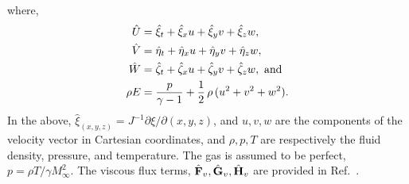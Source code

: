 \documentclass[aps,pra,preprint,groupedaddress]{revtex4-1}
\newcommand{\abs}[1]{\left| #1 \right|} %
\newcommand{\pd}[2]{\dfrac{\partial #1}{\partial #2}}
\renewcommand{\=}[1]{\stackrel{#1}{=}} %
\begin{document}
%
where, 
\begin{align}
  \hat{U} &= \hat{\xi}_t   + \hat{\xi}_x u   + \hat{\xi}_y v   + \hat{\xi}_z w,             \nonumber \\
  \hat{V} &= \hat{\eta}_t  + \hat{\eta}_x u  + \hat{\eta}_y v  + \hat{\eta}_z w,            \nonumber \\
  \hat{W} &= \hat{\zeta}_t + \hat{\zeta}_x u + \hat{\zeta}_y v + \hat{\zeta}_z w,~{\rm and} \nonumber \\
  \rho E  &= \frac{p}{\gamma-1} + \frac{1}{2}\,\rho \,(u^2+v^2+w^2).
\end{align}
%
In the above, $\hat{\xi}_{(x,y,z)} = J^{-1} \partial \xi/\partial {(x,y,z)}$,
and $u,v,w$ are the components of the velocity vector in Cartesian coordinates,
and $\rho,p,T$ are respectively the fluid density, pressure, and temperature.
The gas is assumed to be perfect, $p = \rho T/\gamma M^2_\infty$. The viscous
flux terms, $\hat{\bf F}_v,\hat{\bf G}_v,\hat{\bf H}_v$ are provided in
Ref.~\cite{visbal_2002a}.

%
\end{document}
